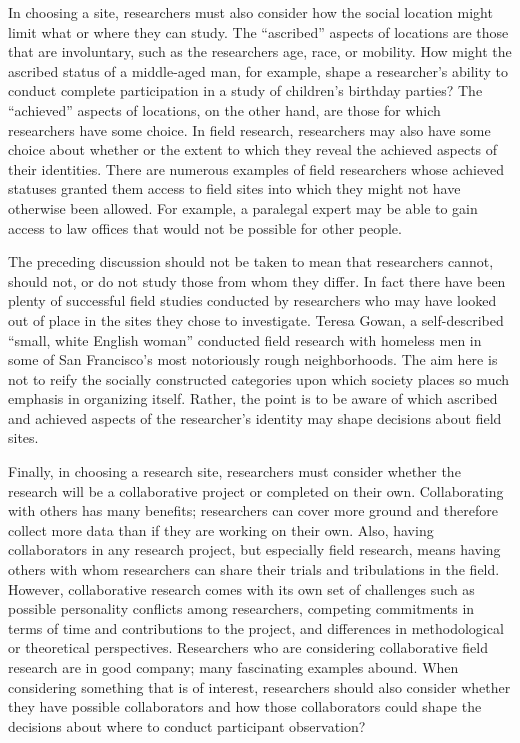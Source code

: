 In choosing a site, researchers must also consider how the social location might limit what or where they can study. The ``ascribed'' aspects of locations are those that are involuntary, such as the researchers age, race, or mobility. How might the ascribed status of a middle-aged man, for example, shape a researcher's ability to conduct complete participation in a study of children's birthday parties? The ``achieved'' aspects of locations, on the other hand, are those for which researchers have some choice. In field research, researchers may also have some choice about whether or the extent to which they reveal the achieved aspects of their identities. There are numerous examples of field researchers whose achieved statuses granted them access to field sites into which they might not have otherwise been allowed. For example, a paralegal expert may be able to gain access to law offices that would not be possible for other people.

The preceding discussion should not be taken to mean that researchers cannot, should not, or do not study those from whom they differ. In fact there have been plenty of successful field studies conducted by researchers who may have looked out of place in the sites they chose to investigate. Teresa Gowan, a self-described ``small, white English woman'' conducted field research with homeless men in some of San Francisco's most notoriously rough neighborhoods\cite{gowan2010hobos}. The aim here is not to reify the socially constructed categories upon which society places so much emphasis in organizing itself. Rather, the point is to be aware of which ascribed and achieved aspects of the researcher's identity may shape decisions about field sites.

Finally, in choosing a research site, researchers must consider whether the research will be a collaborative project or completed on their own. Collaborating with others has many benefits; researchers can cover more ground and therefore collect more data than if they are working on their own. Also, having collaborators in any research project, but especially field research, means having others with whom researchers can share their trials and tribulations in the field. However, collaborative research comes with its own set of challenges such as possible personality conflicts among researchers, competing commitments in terms of time and contributions to the project, and differences in methodological or theoretical perspectives. Researchers who are considering collaborative field research are in good company; many fascinating examples abound. When considering something that is of interest, researchers should also consider whether they have possible collaborators and how those collaborators could shape the decisions about where to conduct participant observation?

